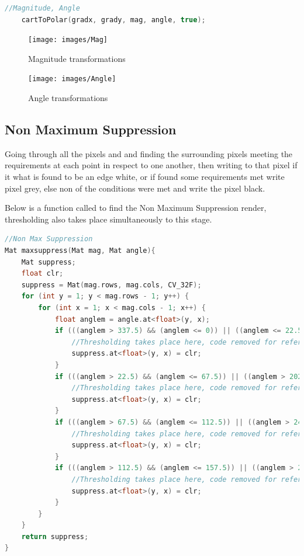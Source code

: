\documentclass[a4paper, 10pt]{article}
\begin{document}
\begin{lstlisting}[language = C++]
	//Magnitude, Angle
	cartToPolar(gradx, grady, mag, angle, true);
\end{lstlisting}

\begin{figure}[H]
  \texttt{[image: images/Mag]}
  \caption{Magnitude transformations}
  \label{fig:Magnitude transformations}
\end{figure}

\begin{figure}[H]
  \texttt{[image: images/Angle]}
  \caption{Angle transformations}
  \label{fig:Angle transformations}
\end{figure}



\subsection{Non Maximum Suppression}

Going through all the pixels and and finding the surrounding pixels meeting the requirements at each point in respect to one another, then writing to that pixel if it what is found to be an edge white, or if found some requirements met write pixel grey, else non of the conditions were met and write the pixel black.

Below is a function called to find the Non Maximum Suppression render, thresholding also takes place simultaneously to this stage.

\begin{lstlisting}[language = C++]
//Non Max Suppression
Mat maxsuppress(Mat mag, Mat angle){
	Mat suppress;
	float clr;
	suppress = Mat(mag.rows, mag.cols, CV_32F);
	for (int y = 1; y < mag.rows - 1; y++) {
		for (int x = 1; x < mag.cols - 1; x++) {
			float anglem = angle.at<float>(y, x);
			if (((anglem > 337.5) && (anglem <= 0)) || ((anglem <= 22.5) && (anglem > 0)) || ((anglem > 157.5) && (anglem <= 202.5))){
				//Thresholding takes place here, code removed for reference 
				suppress.at<float>(y, x) = clr;
			}
			if (((anglem > 22.5) && (anglem <= 67.5)) || ((anglem > 202.5) && (anglem <= 247.5))){
				//Thresholding takes place here, code removed for reference 
				suppress.at<float>(y, x) = clr;
			}
			if (((anglem > 67.5) && (anglem <= 112.5)) || ((anglem > 245.5) && (anglem <= 292.5))){
				//Thresholding takes place here, code removed for reference 
				suppress.at<float>(y, x) = clr;
			}
			if (((anglem > 112.5) && (anglem <= 157.5)) || ((anglem > 292.5) && (anglem <= 337.5))){
				//Thresholding takes place here, code removed for reference 
				suppress.at<float>(y, x) = clr;
			}
		}
	}
	return suppress;
}
\end{lstlisting}
\end{document}
